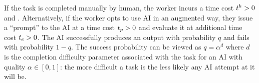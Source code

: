 \documentclass{article}
\theoremstyle{plain}
\theoremstyle{plain}
\newtheorem{definition}[theorem]{Definition}
\begin{document}
\begin{comment}
Definitions~\ref{def:manual_task} to \ref{def:ai_chain} formalize these ideas.
\begin{definition}[Manual Task]
\label{def:manual_task}
A task is said to be done manually if it is executed by a human in its entirety without the help of AI. 
The skill and time costs of operating manual task `i' for a human is $(\humanhc{i}, \humantime{i})$.
\end{definition}
\begin{definition}[Augmented Task]
\label{def:augmented_task}
A task is said to be augmented (by the AI) if it is executed by the AI and its output is reviewed by human before being pass on. 
The skill and time costs of operating augmented task `i' for a human is $(\machinehc{i}, \frac{\machinetime{i}{q_i}})$.
\end{definition}
\begin{definition}[Automated Task]
\label{def:automated_task}
A task is said to be automated (by the AI) if it is executed by the AI in its entirety without direct human intervention.
The direct time and skill costs of overseeing automated task `i' for a human is zero: $(0,0)$.
\end{definition}
\begin{definition}[AI Chain]
\label{def:ai_chain}
An AI chain is a sequence of tasks $(r, r+1, \dots, r+n)$ such that tasks $(r, r+1, \dots, r+n-1)$ are automated, and task $r+n$ is augmented.
The time and skill costs of an AI chain are given by $(\machinehc{r+n}, \frac{\machinetime{r+n}}{\prod_{s=r}^{r+n} q_s})$, where $q_s$ denotes the AI success probability of task $s$.
\end{definition}
Intuitively, this says that in a chain of AI-completed tasks, all but the last task can be completed without direct human intervention, but before passed on, the output of the chain must be reviewed by a human worker who incurred a time management cost $\machinetime{}$ and management skill cost $\machinehc{}$.
Note, however, that producing a successful output depends on the success probability of each of the interim automated tasks within the chain and it is in this way that the AI will affect the overall outcome of the chain.

\end{comment}





If the task is completed manually by human, the worker incurs a time cost $t^{h}_{} > 0$ and .
Alternatively, if the worker opts to use AI in an augmented way, they issue a ``prompt'' to the AI at a time cost $t_{p} > 0$ and evaluate it at additional time cost $t_{e} > 0$.
The AI successfully produces an output with probability $q$ and fails with probability $1-q$. 
The success probability can be viewed as $q=\alpha^d$ where $d$ is the completion difficulty parameter associated with the task for an AI with quality $\alpha \in [0,1]$: the more difficult a task is the less likely any AI attempt at it will be.
\end{document}
